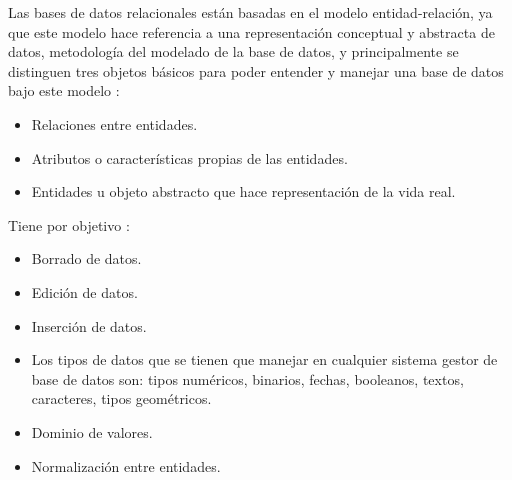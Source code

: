 Las bases de datos relacionales están basadas en el modelo  entidad-relación, ya 
que este modelo hace referencia a una representación conceptual y abstracta de 
datos, metodología del modelado de la base de datos, y principalmente se 
distinguen tres objetos básicos para poder entender y manejar una base de datos 
bajo este modelo \cite{db:ibm:center}:

\begin{itemize}
	\item Relaciones entre entidades.
	\item Atributos o características propias de las entidades.
	\item Entidades u objeto abstracto que hace representación de la vida 
		real.
\end{itemize}

Tiene por objetivo \cite{bases_relacionales_prin_dis}:

\begin{itemize}
	\item Borrado de datos.
	\item Edición de datos.
	\item Inserción de datos.
	\item Los tipos de datos que se tienen que manejar en cualquier sistema 
		gestor de base de datos son: tipos numéricos, binarios, fechas, 
		booleanos, textos, caracteres, tipos geométricos.
	\item Dominio de valores.
	\item Normalización entre entidades.
\end{itemize}

